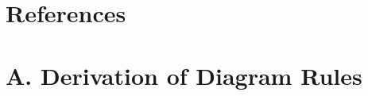\documentclass{article}
\begin{document}

\section*{References}
    
    


\section*{A. Derivation of Diagram Rules}
\end{document}
